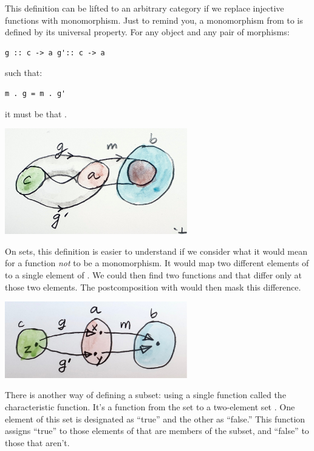 This definition can be lifted to an arbitrary category if we replace
injective functions with monomorphism. Just to remind you, a
monomorphism  from  to  is defined by its
universal property. For any object  and any pair of morphisms:

\begin{Verbatim}[commandchars=\\\{\}]
g :: c -> a g':: c -> a
\end{Verbatim}

such that:

\begin{Verbatim}[commandchars=\\\{\}]
m . g = m . g'
\end{Verbatim}

it must be that .

\includegraphics[width=3.12500in]{images/monomorphism.jpg}

On sets, this definition is easier to understand if we consider what it
would mean for a function  \emph{not} to be a monomorphism. It
would map two different elements of  to a single element of
. We could then find two functions  and
 that differ only at those two elements. The
postcomposition with  would then mask this difference.

\includegraphics[width=3.12500in]{images/notmono.jpg}

There is another way of defining a subset: using a single function
called the characteristic function. It's a function  from the
set  to a two-element set . One element of this set
is designated as ``true'' and the other as ``false.'' This function
assigns ``true'' to those elements of  that are members of the
subset, and ``false'' to those that aren't.

